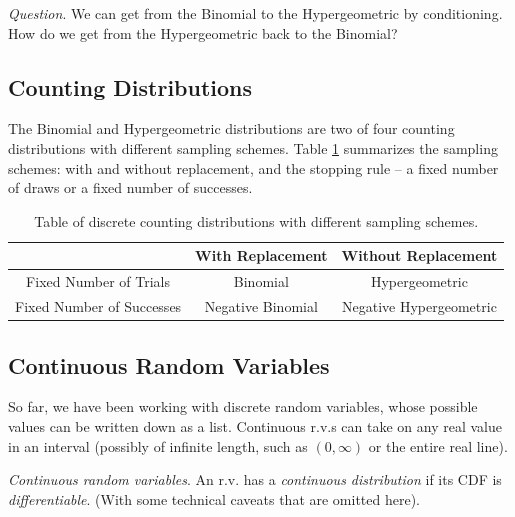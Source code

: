 \emph{Question}. 
We can get from the Binomial to the Hypergeometric by conditioning. 
How do we get from the Hypergeometric back to the Binomial?

\clearpage
\subsection{Counting Distributions}

The Binomial and Hypergeometric distributions 
are two of four counting distributions with different sampling schemes. 
Table \ref{tab:counting} summarizes the sampling schemes: 
with and without replacement, 
and the stopping rule --
a fixed number of draws or a fixed number of successes.

\begin{table}[h!]
\centering
\begin{tabular}{| c | c | c |}
\hline
& With Replacement & Without Replacement \\\hline
Fixed Number of Trials & Binomial & Hypergeometric \\\hline
Fixed Number of Successes & Negative Binomial & Negative Hypergeometric \\\hline
\end{tabular}
\caption{%
Table of discrete counting distributions with different sampling schemes.
}
\label{tab:counting}
\end{table}

\subsection{Continuous Random Variables}

So far, 
we have been working with discrete random variables, 
whose possible values can be written down as a list. 
Continuous r.v.s can take on any real value in an interval (possibly of infinite length, 
such as \((0,\infty)\) or the entire real line).

\emph{Continuous random variables}. 
An r.v. has a \emph{continuous distribution} if its CDF is \emph{differentiable}. 
(With some technical caveats that are omitted here).

